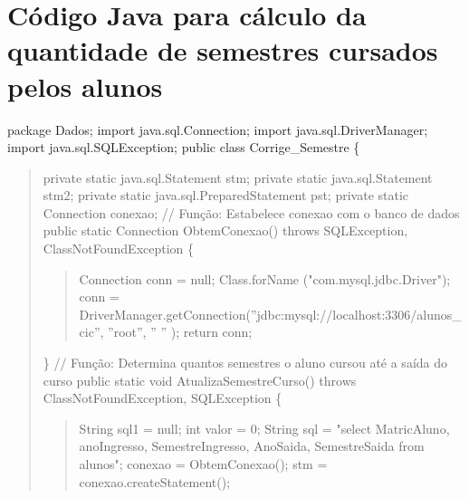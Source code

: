 
\chapter{Código Java para cálculo da quantidade de semestres cursados pelos alunos} \label{apendiceA}


\noindent package Dados; \newline
import java.sql.Connection; \newline
import java.sql.DriverManager; \newline
import java.sql.SQLException; 
\newline
\newline
public class Corrige\_Semestre \{ 
\begin{quote}
	private static java.sql.Statement stm; \newline
	private static java.sql.Statement stm2; \newline
	private static java.sql.PreparedStatement pst; \newline
	private static Connection conexao; \newline
	\newline		
	// Função: Estabelece conexao com o banco de dados \newline
	public static Connection ObtemConexao() throws SQLException, ClassNotFoundException \{
	\begin{quote}
		Connection conn = null; \newline
		Class.forName ("com.mysql.jdbc.Driver"); \newline
		conn = DriverManager.getConnection(''jdbc:mysql://localhost:3306/alunos\_cic'', ''root'', '' '' ); \newline
		return conn;
	\end{quote}
	\} \newline
	\newline
	//	Função: Determina quantos semestres o aluno cursou até a saída do curso \newline
	public static void AtualizaSemestreCurso() throws ClassNotFoundException, SQLException \{
	\begin{quote}
		String sql1 = null; \newline
		int valor = 0; \newline
		String sql = "select MatricAluno, anoIngresso, SemestreIngresso, AnoSaida, SemestreSaida from alunos"; \newline
		conexao = ObtemConexao(); \newline
		stm = conexao.createStatement(); \newline

\end{quote}
\end{quote}
